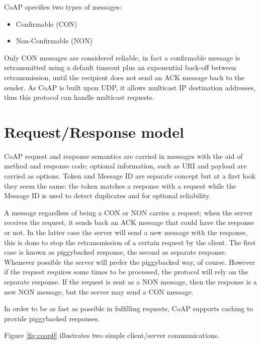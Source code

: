 	CoAP specifies two types of messages:
	\begin{itemize}
		\item Confirmable (CON)
		\item Non-Confirmable (NON)
	\end{itemize}
	Only CON messages are considered reliable, in fact a confirmable message is retransmitted using a default timeout plus an exponential back-off between retransmission, until the recipient does not send an ACK message back to the sender.\newline
	As CoAP is built upon UDP, it allows multicast IP destination addresses, thus this protocol can handle multicast requests.\newline
	
	\section{Request/Response model}
	CoAP request and response semantics are carried in messages with the aid of method and response code; optional information, such as URI and payload are carried as options.\newline
	Token and Message ID are separate concept but at a first look they seem the same: the token matches a response
	with a request while the Message ID is used to detect duplicates and for optional reliability.\newline
	
	A message regardless of being a CON or NON carries a request; when the server receives the request, it sends back an ACK message that could have the response or not. In the latter case the server will
	send a new message with the response, this is done to stop the retransmission of a certain request by the client.\newline
	The first case is known as piggybacked response, the second as separate response. Whenever possible the server will prefer the piggybacked way, of course. However if the request requires some times to be processed, the protocol will rely on the separate response.\newline
	If the request is sent as a NON message, then the response is a new NON message, but the server may send a CON message.\newline
	
	In order to be as fast as possible in fulfilling requests, CoAP supports caching to provide piggybacked responses.\newline
	
	Figure \ref{fig:coap0} illustrates two simple client/server communications.
	
